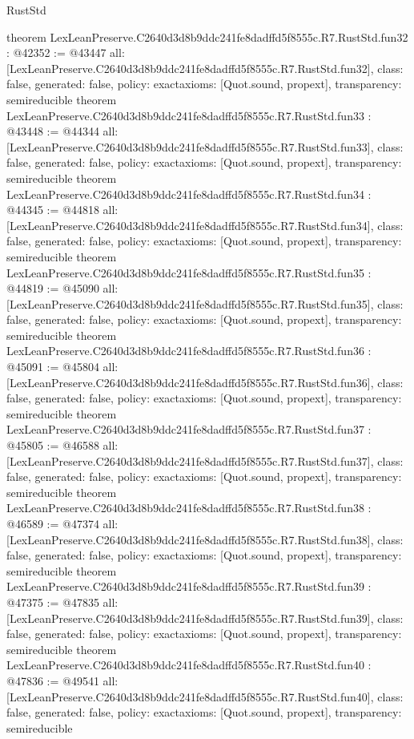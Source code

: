 \begin{lexlean}{RustStd}
\begin{coremodule}
{}
theorem LexLeanPreserve.C2640d3d8b9ddc241fe8dadffd5f8555c.R7.RustStd.fun32 : @42352 := @43447 {
  all: [LexLeanPreserve.C2640d3d8b9ddc241fe8dadffd5f8555c.R7.RustStd.fun32],
  class: false,
  generated: false,
  policy: exact{axioms: [Quot.sound, propext]},
  transparency: semireducible
}
theorem LexLeanPreserve.C2640d3d8b9ddc241fe8dadffd5f8555c.R7.RustStd.fun33 : @43448 := @44344 {
  all: [LexLeanPreserve.C2640d3d8b9ddc241fe8dadffd5f8555c.R7.RustStd.fun33],
  class: false,
  generated: false,
  policy: exact{axioms: [Quot.sound, propext]},
  transparency: semireducible
}
theorem LexLeanPreserve.C2640d3d8b9ddc241fe8dadffd5f8555c.R7.RustStd.fun34 : @44345 := @44818 {
  all: [LexLeanPreserve.C2640d3d8b9ddc241fe8dadffd5f8555c.R7.RustStd.fun34],
  class: false,
  generated: false,
  policy: exact{axioms: [Quot.sound, propext]},
  transparency: semireducible
}
theorem LexLeanPreserve.C2640d3d8b9ddc241fe8dadffd5f8555c.R7.RustStd.fun35 : @44819 := @45090 {
  all: [LexLeanPreserve.C2640d3d8b9ddc241fe8dadffd5f8555c.R7.RustStd.fun35],
  class: false,
  generated: false,
  policy: exact{axioms: [Quot.sound, propext]},
  transparency: semireducible
}
theorem LexLeanPreserve.C2640d3d8b9ddc241fe8dadffd5f8555c.R7.RustStd.fun36 : @45091 := @45804 {
  all: [LexLeanPreserve.C2640d3d8b9ddc241fe8dadffd5f8555c.R7.RustStd.fun36],
  class: false,
  generated: false,
  policy: exact{axioms: [Quot.sound, propext]},
  transparency: semireducible
}
theorem LexLeanPreserve.C2640d3d8b9ddc241fe8dadffd5f8555c.R7.RustStd.fun37 : @45805 := @46588 {
  all: [LexLeanPreserve.C2640d3d8b9ddc241fe8dadffd5f8555c.R7.RustStd.fun37],
  class: false,
  generated: false,
  policy: exact{axioms: [Quot.sound, propext]},
  transparency: semireducible
}
theorem LexLeanPreserve.C2640d3d8b9ddc241fe8dadffd5f8555c.R7.RustStd.fun38 : @46589 := @47374 {
  all: [LexLeanPreserve.C2640d3d8b9ddc241fe8dadffd5f8555c.R7.RustStd.fun38],
  class: false,
  generated: false,
  policy: exact{axioms: [Quot.sound, propext]},
  transparency: semireducible
}
theorem LexLeanPreserve.C2640d3d8b9ddc241fe8dadffd5f8555c.R7.RustStd.fun39 : @47375 := @47835 {
  all: [LexLeanPreserve.C2640d3d8b9ddc241fe8dadffd5f8555c.R7.RustStd.fun39],
  class: false,
  generated: false,
  policy: exact{axioms: [Quot.sound, propext]},
  transparency: semireducible
}
theorem LexLeanPreserve.C2640d3d8b9ddc241fe8dadffd5f8555c.R7.RustStd.fun40 : @47836 := @49541 {
  all: [LexLeanPreserve.C2640d3d8b9ddc241fe8dadffd5f8555c.R7.RustStd.fun40],
  class: false,
  generated: false,
  policy: exact{axioms: [Quot.sound, propext]},
  transparency: semireducible
}
\end{coremodule}
\end{lexlean}
